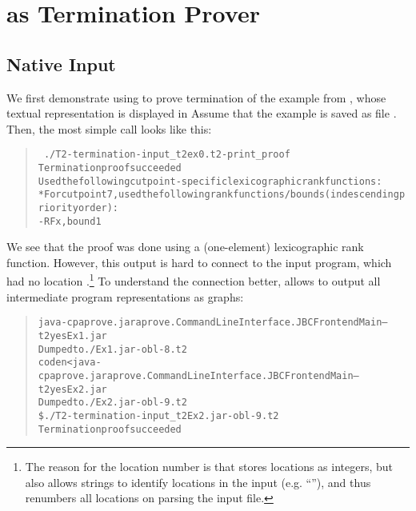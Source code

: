 \section{ as Termination Prover}
\subsection{Native Input}
We first demonstrate using  to prove termination of the example from
, whose textual representation is displayed in 
Assume that the example is saved as file . Then, 
the most simple  call looks like this:
\begin{quote}
  \vspace{-2ex}
\begin{alltt}
\small
\ ./T2 -termination -input\_t2 ex0.t2 -print\_proof
Termination proof succeeded
Used the following cutpoint-specific lexicographic rank functions:
 * For cutpoint 7, used the following rank functions/bounds (in descending priority order):
    - RF x, bound 1
\end{alltt}
  \vspace{-1ex}
\end{quote}
We see that the proof was done using a (one-element) lexicographic rank function.
However, this output is hard to connect to the input program, which had no
location .\footnote{The reason for the location number is that 
  stores 
  locations as integers, but also allows strings to identify locations in the
  input (e.g. ``''), and thus renumbers all locations on
  parsing the input file.}
To understand the connection better,  allows to output all intermediate
program representations as  graphs:
\begin{quote}
  \vspace{-1ex}
\begin{alltt}
\small
\ii java -cp aprove.jar aprove.CommandLineInterface.JBCFrontendMain --t2 yes Ex1.jar
Dumped to ./Ex1.jar-obl-8.t2
\\code{n} <  java -cp aprove.jar aprove.CommandLineInterface.JBCFrontendMain --t2 yes Ex2.jar
Dumped to ./Ex2.jar-obl-9.t2
\$ ./T2 -termination -input_t2 Ex2.jar-obl-9.t2
Termination proof succeeded
  \end{alltt}
  \vspace{-2ex}
\end{quote}

